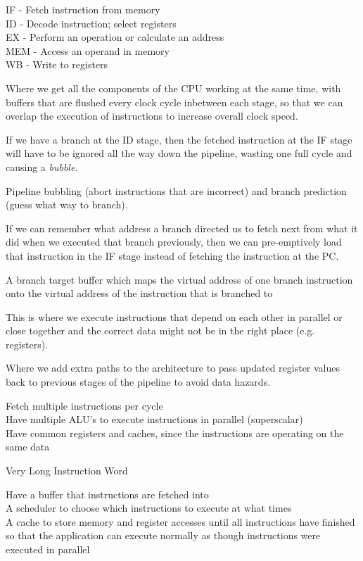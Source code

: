 {
  IF - Fetch instruction from memory\\
  ID - Decode instruction; select registers\\
  EX - Perform an operation or calculate an address\\
  MEM - Access an operand in memory\\
  WB - Write to registers
}

{
  Where we get all the components of the CPU working at the same time, with
  buffers that are flushed every clock cycle inbetween each stage, so that we
  can overlap the execution of instructions to increase overall clock speed.
}

{
  If we have a branch at the ID stage, then the fetched instruction at the
  IF stage will have to be ignored all the way down the pipeline, wasting one
  full cycle and causing a \textit{bubble}.
}

{
  Pipeline bubbling (abort instructions that are incorrect) and branch
  prediction (guess what way to branch).
}

{
  If we can remember what address a branch directed us to fetch next from what
  it did when we executed that branch previously, then we can pre-emptively
  load that instruction in the IF stage instead of fetching the instruction at
  the PC.
}

{
  A branch target buffer which maps the virtual address of one branch
  instruction onto the virtual address of the instruction that is branched to
}

{
  This is where we execute instructions that depend on each other in parallel or
  close together and the correct data might not be in the right place (e.g.
  registers).
}

{
  Where we add extra paths to the architecture to pass updated register values
  back to previous stages of the pipeline to avoid data hazards.
}

{
  Fetch multiple instructions per cycle\\
  Have multiple ALU's to execute instructions in parallel (superscalar)\\
  Have common registers and caches, since the instructions are operating on the
  same data
}

{
  Very Long Instruction Word
}

{
  Have a buffer that instructions are fetched into\\
  A scheduler to choose which instructions to execute at what times\\
  A cache to store memory and register accesses until all instructions have
  finished so that the application can execute normally as though instructions
  were executed in parallel
}

